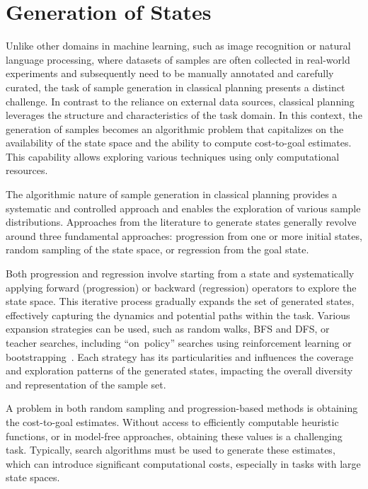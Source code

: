 \section{Generation of States}
\label{sec:generation}

Unlike other domains in machine learning, such as image recognition or natural language processing, where datasets of samples are often collected in real-world experiments and subsequently need to be manually annotated and carefully curated, the task of sample generation in classical planning presents a distinct challenge. In contrast to the reliance on external data sources, classical planning leverages the structure and characteristics of the task domain. In this context, the generation of samples becomes an algorithmic problem that capitalizes on the availability of the state space and the ability to compute cost-to-goal estimates. This capability allows exploring various techniques using only computational resources.

The algorithmic nature of sample generation in classical planning provides a systematic and controlled approach and enables the exploration of various sample distributions. Approaches from the literature to generate states generally revolve around three fundamental approaches: progression from one or more initial states, random sampling of the state space, or regression from the goal state.

Both progression and regression involve starting from a state and systematically applying forward (progression) or backward (regression) operators to explore the state space. This iterative process gradually expands the set of generated states, effectively capturing the dynamics and potential paths within the task. Various expansion strategies can be used, such as random walks, BFS and DFS, or teacher searches, including ``on~policy'' searches using reinforcement learning or bootstrapping~\cite{Arfaee.etal/2011}. Each strategy has its particularities and influences the coverage and exploration patterns of the generated states, impacting the overall diversity and representation of the sample set.

A problem in both random sampling and progression-based methods is obtaining the cost-to-goal estimates. Without access to efficiently computable heuristic functions, or in model-free approaches, obtaining these values is a challenging task. Typically, search algorithms must be used to generate these estimates, which can introduce significant computational costs, especially in tasks with large state spaces.

